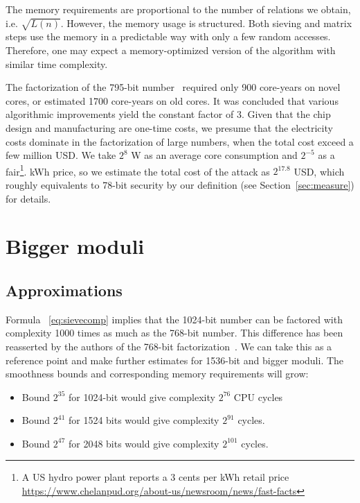 \documentclass[a4paper]{article}
\begin{document}
The memory requirements are proportional to the number of relations we obtain, i.e. $\sqrt{L(n)}$. However, the memory usage is structured. Both sieving and matrix steps use the memory in a predictable way with only a few random accesses. Therefore, one may expect a memory-optimized version of the algorithm with similar time complexity.

The factorization of the 795-bit number~\cite{factor795} required only 900 core-years on novel cores, or estimated 1700 core-years on old cores. It was concluded that various algorithmic improvements yield the constant factor of 3. Given that the chip design and manufacturing are one-time costs, we presume that the electricity costs dominate in the factorization of large numbers, when the total cost exceed a few million USD.  We take $2^8$ W as an average core consumption and $2^{-5}$ as a fair\footnote{A US hydro power plant reports a 3 cents per kWh retail price \url{https://www.chelanpud.org/about-us/newsroom/news/fast-facts}}. kWh price, so we  estimate the total cost of the attack as   $2^{17.8}$ USD, which roughly equivalents to 78-bit security by our definition (see Section~\ref{sec:measure}) for details.

\section{Bigger moduli}
\subsection{Approximations}\label{sec:approx}
Formula ~\eqref{eq:sievecomp} implies that the 1024-bit number can be factored with complexity 1000 times as much  as the 768-bit number. This difference has been reasserted by the authors of the 768-bit factorization~\cite{DBLP:conf/crypto/KleinjungAFLTBGKMORTZ10}. We can take this as a reference point and make further estimates for 1536-bit and bigger moduli. The smoothness bounds and corresponding memory requirements will grow:
\begin{itemize}
    \item Bound $2^{35}$ for 1024-bit would give  complexity $2^{76}$ CPU cycles
    \item Bound $2^{41}$ for 1524 bits would give complexity $2^{91}$ cycles.
    \item Bound $2^{47}$ for 2048 bits would give complexity $2^{101}$ cycles.
 \end{itemize}
 
\end{document}
